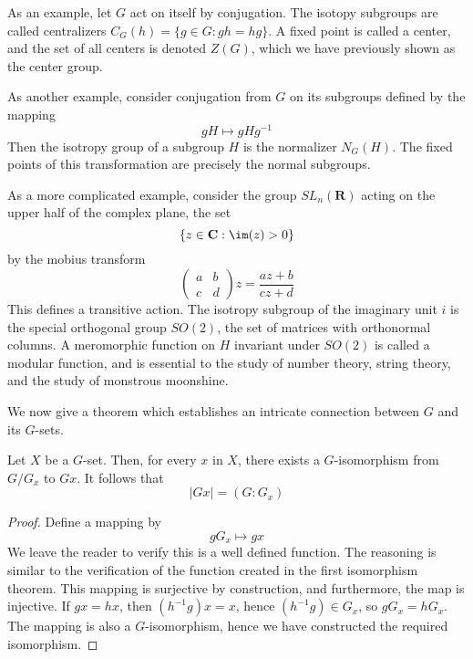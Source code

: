 As an example, let $G$ act on itself by conjugation. The isotopy subgroups are called centralizers $C_G(h) = \{ g \in G : gh = hg \}$. A fixed point is called a center, and the set of all centers is denoted $Z(G)$, which we have previously shown as the center group.

As another example, consider conjugation from $G$ on its subgroups defined by the mapping
%
\[ gH \mapsto gHg^{-1} \]
%
Then the isotropy group of a subgroup $H$ is the normalizer $N_G(H)$. The fixed points of this transformation are precisely the normal subgroups.

As a more complicated example, consider the group $SL_n(\mathbf{R})$ acting on the upper half of the complex plane, the set
%
\[ \{ z \in \mathbf{C} : \im(z) > 0 \} \]
%
by the mobius transform
%
\[\begin{pmatrix} a & b \\ c & d \end{pmatrix} z = \frac{az + b}{cz + d}\]
%
This defines a transitive action. The isotropy subgroup of the imaginary unit $i$ is the special orthogonal group $SO(2)$, the set of matrices with orthonormal columns. A meromorphic function on $H$ invariant under $SO(2)$ is called a modular function, and is essential to the study of number theory, string theory, and the study of monstrous moonshine.

We now give a theorem which establishes an intricate connection between $G$ and its $G$-sets.

\begin{theorem} 
    Let $X$ be a $G$-set. Then, for every $x$ in $X$, there exists a $G$-isomorphism from $G/G_x$ to $Gx$. It follows that
    \[ |Gx| = (G:G_x) \]
\end{theorem}
\begin{proof}
    Define a mapping by
    \[ gG_x \mapsto gx \]
    We leave the reader to verify this is a well defined function. The reasoning is similar to the verification of the function created in the first isomorphism theorem. This mapping is surjective by construction, and furthermore, the map is injective. If $gx = hx$, then $(h^{-1}g)x = x$, hence $(h^{-1}g) \in G_x$, so $gG_x = hG_x$. The mapping is also a $G$-isomorphism, hence we have constructed the required isomorphism.
\end{proof}

